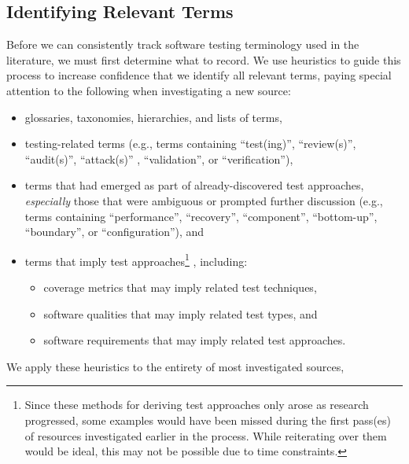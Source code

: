 \subsection{Identifying Relevant Terms}\label{ident-terms}
Before we can consistently track software testing terminology used in the
literature, we must first determine what to record. We use heuristics to guide
this process to increase confidence that we identify all relevant terms, paying
special attention to the following when investigating a new source:
\begin{itemize}
    \item glossaries, taxonomies, hierarchies, and lists of terms,
    \item testing-related terms (e.g., terms containing ``test(ing)'',
          \ifnotpaper ``review(s)'', ``audit(s)'', ``attack(s)''%
              , \fi ``validation'', or ``verification''),
    \item terms that had emerged as part of already-discovered
          test approaches, \emph{especially} those that were ambiguous
          or prompted further discussion (e.g., terms containing
          ``performance'', ``recovery'', ``component'', ``bottom-up'',
          \ifnotpaper ``boundary'', \fi or ``configuration''), and
    \item terms that imply test approaches\ifnotpaper\footnote{
                  Since these methods for deriving test approaches only arose
                  as research progressed, some examples would have been missed
                  during the first pass(es) of resources investigated earlier
                  in the process. While reiterating over them would be ideal,
                  this may not be possible due to time constraints.
              }%
          \fi, including:
          \newcommand\derivTest[2]{#1 that may imply \ifnotpaper related \fi test #2}
          \begin{itemize}
              \item \derivTest{coverage metrics}{techniques},
              \item {}\label{qual-types}
                    \derivTest{software qualities}{types}, and
              \item {}\label{req-apps}
                    \derivTest{\ifnotpaper software \fi requirements}{approaches}.
          \end{itemize}
\end{itemize}
We apply these heuristics to the entirety of most investigated sources,
